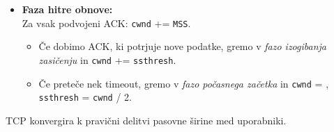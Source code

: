 \documentclass[a4paper,8pt]{extarticle}
\begin{document}
\begin{multicols}{4}
\begin{itemize}
	\item \textbf{Faza hitre obnove:}\\
	Za vsak podvojeni ACK: \texttt{cwnd} += \texttt{MSS}.
	\begin{itemize}
		\item Če dobimo ACK, ki potrjuje nove podatke, gremo v \emph{fazo izogibanja zasičenju} in \texttt{cwnd} += \texttt{ssthresh}.
		\item Če preteče nek timeout, gremo v \emph{fazo počasnega začetka} in  \texttt{cwnd} = , \texttt{ssthresh} = \texttt{cwnd} / 2.
	\end{itemize}
\end{itemize}


TCP konvergira k pravični delitvi pasovne širine med uporabniki.

\end{multicols}
\end{document}
